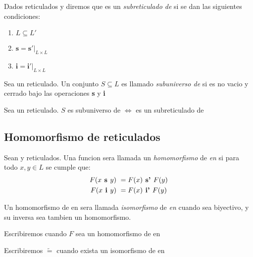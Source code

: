 \begin{definition}
  Dados reticulados \reticulAlg y  diremos que \reticulAlg
  es un \emph{subreticulado de}  si se dan las siguientes condiciones:
  \begin{enumerate}
    \item $L \subseteq L'$
    \item $\textbf{s} = \textbf{s}'\vert_{L\times L}$
    \item $\textbf{i} = \textbf{i}'\vert_{L\times L}$
  \end{enumerate}
\end{definition}
\begin{definition}
  Sea \reticulAlg un reticulado. Un conjunto $S \subseteq L$ es llamado \emph{subuniverso de} \reticulAlg
  si es no vacio y cerrado bajo las operaciones \textbf{s} y \textbf{i}
\end{definition}
\begin{remark}
  Sea \reticulAlg un reticulado. $S$ es subuniverso de \reticulAlg $\iff$ 
  es un subreticulado de \reticulAlg
\end{remark}

\subsection{Homomorfismo de reticulados}

\begin{definition}
  Sean \reticulAlg y  reticulados. Una funcion 
  sera llamada un \emph{homomorfismo} de \reticulAlg \emph{en}  si
  para todo $x, y \in L$ se cumple que:
  \begin{alignat*}{2}
    F(x\textbf{ s }y) &\ = F(x)\textbf{ s' }F(y)\\
    F(x\textbf{ i }y) &\ = F(x)\textbf{ i' }F(y)\\    
  \end{alignat*}

  Un homomorfismo de \reticulAlg en  sera llamada \emph{isomorfismo}
  de \reticulAlg \emph{en}  cuando sea biyectivo, y su inversa
  sea tambien un homomorfismo.

  Escribiremos  cuando $F$ sea un homomorfismo
  de \reticulAlg en 

  Escribiremos \reticulAlg $\tilde{=}$  cuando exista
  un isomorfismo de \reticulAlg en 
\end{definition}

